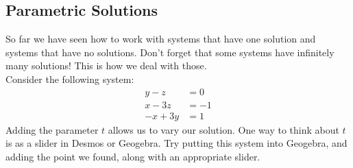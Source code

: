 \documentclass[12pt,fleqn]{book}
\begin{document}
\subsection*{Parametric Solutions}
So far we have seen how to work with systems that have one solution and systems that have no solutions.  Don't forget that some systems have infinitely many solutions!  This is how we deal with those.
\\[1em]
Consider the following system:
\begin{align*}
	y-z   & = 0  \\
	x-3z  & = -1 \\
	-x+3y & =1
\end{align*}
\vfill
Adding the parameter $t$ allows us to vary our solution.  One way to think about $t$ is as a slider in Desmos or Geogebra.  Try putting this system into Geogebra, and adding the point we found, along with an appropriate slider.
\clearpage
\end{document}
